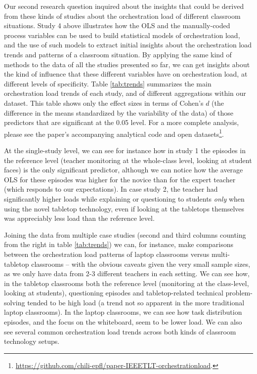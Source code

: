 \documentclass[10pt,journal,compsoc]{IEEEtran}
\begin{document}
Our second research question inquired about the insights that could be derived from these kinds of studies about the orchestration load of different classroom situations. Study 4 above illustrates how the OLS and the manually-coded process variables can be used to build statistical models of orchestration load, and the use of such models to extract initial insights about the orchestration load trends and patterns of a classroom situation. By applying the same kind of methods to the data of all the studies presented so far, we can get insights about the kind of influence that these different variables have on orchestration load, at different levels of specificity. Table \ref{tab:trends} summarizes the main orchestration load trends of each study, and of different aggregations within our dataset. This table shows only the effect sizes in terms of Cohen's $d$ (the difference in the means standardized by the variability of the data) of those predictors that are significant at the 0.05 level. For a more complete analysis, please see the paper's accompanying analytical code and open datasets\footnote{\href{https://github.com/chili-epfl/paper-IEEETLT-orchestrationload}{https://github.com/chili-epfl/paper-IEEETLT-orchestrationload}.}.

At the single-study level, we can see for instance how in study 1 the episodes in the reference level (teacher monitoring at the whole-class level, looking at student faces) is the only significant predictor, although we can notice how the average OLS for these episodes was higher for the novice than for the expert teacher (which responds to our expectations). In case study 2, the teacher had significantly higher loads while explaining or questioning to students \textit{only} when using the novel tabletop technology, even if looking at the tabletops themselves was appreciably less load than the reference level.

Joining the data from multiple case studies (second and third columns counting from the right in table \ref{tab:trends}) we can, for instance, make comparisons between the orchestration load patterns of laptop classrooms versus multi-tabletop classrooms -- with the obvious caveats given the very small sample sizes, as we only have data from 2-3 different teachers in each setting. We can see how, in the tabletop classrooms both the reference level (monitoring at the class-level, looking at students), questioning episodes and tabletop-related technical problem-solving tended to be high load (a trend not so apparent in the more traditional laptop classrooms). In the laptop classrooms, we can see how task distribution episodes, and the focus on the whiteboard, seem to be lower load. We can also see several common orchestration load trends across both kinds of classroom technology setups.
\end{document}
